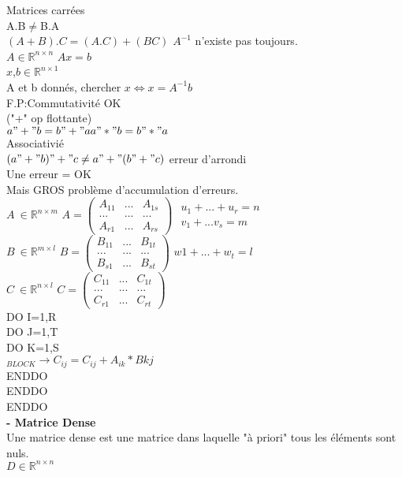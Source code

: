 \documentclass{article}
\begin{document}
    Matrices carrées\\
    A.B$\neq$B.A\\
    $(A+B).C=(A.C)+(BC)$
    $A^{-1}$ n'existe pas toujours.\\
    $A\in\mathbb{R}^{n\times n}$
    $Ax=b$\\
    $x$,$b \in \mathbb{R}^{n\times 1}$\\
    A et b donnés, chercher $x\Leftrightarrow x=A^{-1}b$\\
    F.P:Commutativité OK\\
    ("+" op flottante)\\
    $a"+"b=b"+"a\\
    a"*"b=b"*"a$\\
    Associativié\\
    $(a"+"b)"+"c\neq a"+"(b"+"c)$ erreur d'arrondi\\
    Une erreur = OK\\
    Mais GROS problème d'accumulation d'erreurs.\\
    $A \ 
    \in \mathbb{R}^{n\times m}$
    $A=
    \begin{pmatrix}
        A_{11}&...&A_{1s}\\
        ...&...&...\\
        A_{r1}&...&A_{rs}
    \end{pmatrix}$
    $\begin{matrix}
        u_1+...+u_r=n\\
        v_1+...v_s=m        
    \end{matrix}$\\
    $B \ 
    \in \mathbb{R}^{m\times l}$
    $B=
    \begin{pmatrix}
        B_{11}&...&B_{1t}\\
        ...&...&...\\
        B_{s1}&...&B_{st}
    \end{pmatrix}$
    $w1+...+w_t=l$\\
    $C \ 
    \in \mathbb{R}^{n\times l}$
    $C=
    \begin{pmatrix}
        C_{11}&...&C_{1t}\\
        ...&...&...\\
        C_{r1}&...&C_{rt}
    \end{pmatrix}$\\
    DO I=1,R\\
    \hspace*{0.6cm}DO J=1,T\\
    \hspace*{1.2cm}DO K=1,S\\
    \emph{$_{BLOCK}$}$\to C_{ij}=C_{ij}+A_{ik}*B{kj}$\\
    \hspace*{1.2cm}ENDDO\\
    \hspace*{0.6cm}ENDDO\\
    ENDDO\\
    \textbf{- Matrice Dense}\\
    Une matrice dense est une matrice dans laquelle "à priori" tous les éléments sont nuls.\\
    $D\in \mathbb{R}^{n\times n}$
\end{document}
